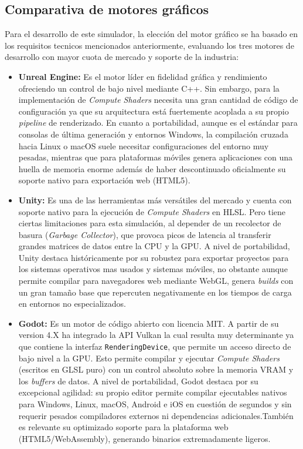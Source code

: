 \subsection{Comparativa de motores gráficos}

Para el desarrollo de este simulador, la elección del motor gráfico se ha basado en los requisitos tecnicos mencionados anteriormente, evaluando los tres motores de desarrollo con mayor cuota de mercado y soporte de la industria:


\begin{itemize}
    \item \textbf{Unreal Engine:} Es el motor líder en fidelidad gráfica y rendimiento ofreciendo un control de bajo nivel mediante C++. Sin embargo, para la implementación de \textit{Compute Shaders} necesita una gran cantidad de código de configuración ya que su arquitectura está fuertemente acoplada a su propio \textit{pipeline} de renderizado. En cuanto a portabilidad, aunque es el estándar para consolas de última generación y entornos Windows, la compilación cruzada hacia Linux o macOS suele necesitar configuraciones del entorno muy pesadas, mientras que para plataformas móviles genera aplicaciones con una huella de memoria enorme además de haber descontinuado oficialmente su soporte nativo para exportación web (HTML5).

    \item \textbf{Unity:} Es una de las herramientas más versátiles del mercado y cuenta con soporte nativo para la ejecución de \textit{Compute Shaders} en HLSL. Pero tiene ciertas limitaciones para esta simulación, al depender de un recolector de basura (\textit{Garbage Collector}), que provoca picos de latencia al transferir grandes matrices de datos entre la CPU y la GPU. A nivel de portabilidad, Unity destaca históricamente por su robustez para exportar proyectos para los  sistemas operativos mas usados y sistemas móviles, no obstante aunque permite compilar para navegadores web mediante WebGL, genera \textit{builds} con un gran tamaño base que repercuten negativamente en los tiempos de carga en entornos no especializados. 

    \item \textbf{Godot:} Es un motor de código abierto con licencia MIT. A partir de su version 4.X ha integrado la API Vulkan la cual resulta muy determinante ya que contiene la interfaz \texttt{RenderingDevice}, que permite un acceso directo de bajo nivel a la GPU. Esto permite compilar y ejecutar \textit{Compute Shaders} (escritos en GLSL puro) con un control absoluto sobre la memoria VRAM y los \textit{buffers} de datos. A nivel de portabilidad, Godot destaca por su excepcional agilidad: su propio editor permite compilar ejecutables nativos para Windows, Linux, macOS, Android e iOS en cuestión de segundos y sin requerir pesados compiladores externos ni dependencias adicionales.También es relevante su optimizado soporte para la plataforma web (HTML5/WebAssembly), generando binarios extremadamente ligeros.

\end{itemize}

